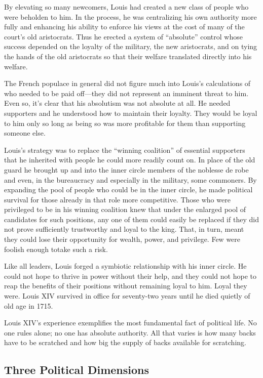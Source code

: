 \documentclass[10pt]{article}
\begin{document}
{\large By elevating so many newcomers, Louis had created a new class of people
who were beholden to him. In the process, he was centralizing his own authority
more fully and enhancing his ability to enforce his views at the cost of many of
the court's old aristocrats. Thus he erected a system of ``absolute'' control
whose success depended on the loyalty of the military, the new aristocrats, and
on tying the hands of the old aristocrats so that their welfare translated
directly into his welfare.}

{\large The French populace in general did not figure much into Louis's
calculations of who needed to be paid off---they did not represent an imminent
threat to him. Even so, it's clear that his absolutism was not absolute at all.
He needed supporters and he understood how to maintain their loyalty. They would
be loyal to him only so long as being so was more profitable for them than
supporting someone else.}

{\large Louis's strategy was to replace the ``winning coalition'' of essential
supporters that he inherited with people he could more readily count on. In place
of the old guard he brought up and into the inner circle members of the noblesse
de robe and even, in the bureaucracy and especially in the military, some
commoners. By expanding the pool of people who could be in the inner circle, he
made political survival for those already in that role more competitive. Those
who were privileged to be in his winning coalition knew that under the enlarged
pool of candidates for such positions, any one of them could easily be replaced
if they did not prove sufficiently trustworthy and loyal to the king. That, in
turn, meant they could lose their opportunity for wealth, power, and privilege.
Few were foolish enough totake such a risk.}

{\large Like all leaders, Louis forged a symbiotic relationship with his inner
circle. He could not hope to thrive in power without their help, and they could
not hope to reap the benefits of their positions without remaining loyal to him.
Loyal they were. Louis XIV survived in office for seventy-two years until he died
quietly of old age in 1715.}

{\large Louis XIV's experience exemplifies the most fundamental fact of
political life. No one rules alone; no one has absolute authority. All that
varies is how many backs have to be scratched and how big the supply of backs
available for scratching.}

\subsection{Three Political Dimensions}
\end{document}
